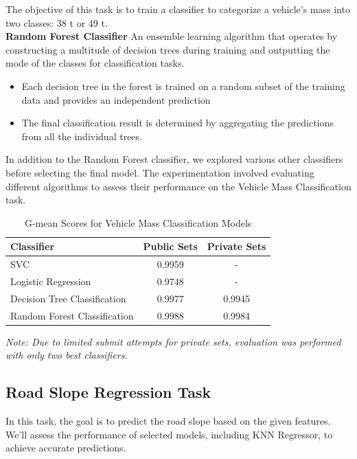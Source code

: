 \documentclass[conference]{IEEEtran}
\begin{document}
The objective of this task is to train a classifier to categorize a vehicle's mass into two classes: 38 t or 49 t. \\
\noindent \textbf{Random Forest Classifier} \hspace{0.2em} An ensemble learning algorithm that operates by constructing a multitude of decision trees during training and outputting the mode of the classes for classification tasks.


\begin{itemize}
\item Each decision tree in the forest is trained on a random subset of the training data and provides an independent prediction
\item The final classification result is determined by aggregating the predictions from all the individual trees.
\end{itemize}

In addition to the Random Forest classifier, we explored various other classifiers before selecting the final model. The experimentation involved evaluating different algorithms to assess their performance on the Vehicle Mass Classification task. 

\begin{table}[ht]
    \centering
    \caption{G-mean Scores for Vehicle Mass Classification Models}
    \begin{tabular}{lcc}
    \toprule
    \textbf{Classifier} & \textbf{Public Sets} & \textbf{Private Sets} \\
    \midrule
    SVC & 0.9959 & - \\
    Logistic Regression & 0.9748 & - \\
    Decision Tree Classification & 0.9977 & 0.9945 \\
    Random Forest Classification & 0.9988 & 0.9984 \\
    \bottomrule
    \end{tabular}
    \begin{flushleft}
        \small\textit{Note: Due to limited submit attempts for private sets, evaluation was performed with only two best classifiers.}
        \end{flushleft}
    \label{tab:gmean-scores}
\end{table}
    


\subsection{Road Slope Regression Task}
In this task, the goal is to predict the road slope based on the given features. We'll assess the performance of selected models, including KNN Regressor, to achieve accurate predictions.
\end{document}
